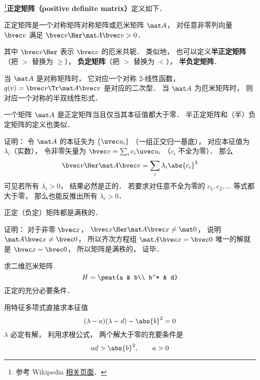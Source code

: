 

\footnote{参考 Wikipedia \href{https://en.wikipedia.org/wiki/Definite_matrix}{相关页面}．}\textbf{正定矩阵（positive definite matrix）}定义如下．
\begin{definition}{}
正定矩阵是一个对称矩阵对称矩阵或厄米矩阵 $\mat A$， 对任意非零列向量 $\bvec v$ 满足 $\bvec v\Her \mat A \bvec v > 0$．
\end{definition}
其中 $\bvec v\Her$ 表示 $\bvec v$ 的厄米共轭． 类似地， 也可以定义\textbf{半正定矩阵}（把 $>$ 替换为 $\geqslant$）， \textbf{负定矩阵}（把 $>$ 替换为 $<$）， \textbf{半负定矩阵}．

当 $\mat A$ 是对称矩阵时， 它对应一个对称 2-线性函数， $q(v) = \bvec v\Tr \mat A \bvec v$ 是对应的二次型． 当 $\mat A$ 为厄米矩阵时， 则对应一个对称的半双线性形式．

\begin{theorem}{}
一个矩阵 $\mat A$ 是正定矩阵当且仅当其本征值都大于零． 半正定矩阵和（半）负定矩阵的定义也类似．
\end{theorem}

证明： 令 $\mat A$ 的本征矢为 $\{\uvec u_i\}$ （一组正交归一基底）， 对应本征值为 $\lambda_i$（实数）， 令非零矢量为 $\bvec v = \sum_i c_i \uvec u_i$ （$c_i$ 不全为零）． 那么
\begin{equation}
\bvec v\Her \mat A \bvec v = \sum_i \lambda_i \abs{c_i}^2
\end{equation}
可见若所有 $\lambda_i > 0$， 结果必然是正的． 若要求对任意不全为零的 $c_1,c_2,\dots$ 等式都大于零， 那么也能反推出所有 $\lambda_i > 0$．

\begin{theorem}{}
正定（负定）矩阵都是满秩的．
\end{theorem}
证明： 对于非零 $\bvec x$， $\bvec x\Her \mat A \bvec x \ne \mat 0$， 说明 $\mat A\bvec x \ne \bvec 0$， 所以齐次方程组 $\mat A\bvec x = \bvec 0$ 唯一的解就是 $\bvec x = \bvec 0$， 所以矩阵是满秩的， 证毕．

\begin{example}{}
求二维厄米矩阵
\begin{equation}
H = \pmat{a & b\\ b^* & d}
\end{equation}
正定的充分必要条件．

用特征多项式直接求本征值
\begin{equation}
(\lambda - a)(\lambda - d) - \abs{b}^2 = 0
\end{equation}
$\lambda$ 必定有解， 利用求根公式， 两个解大于零的充要条件是
\begin{equation}
ad > \abs{b}^2, \qquad
a > 0
\end{equation}
\end{example}
